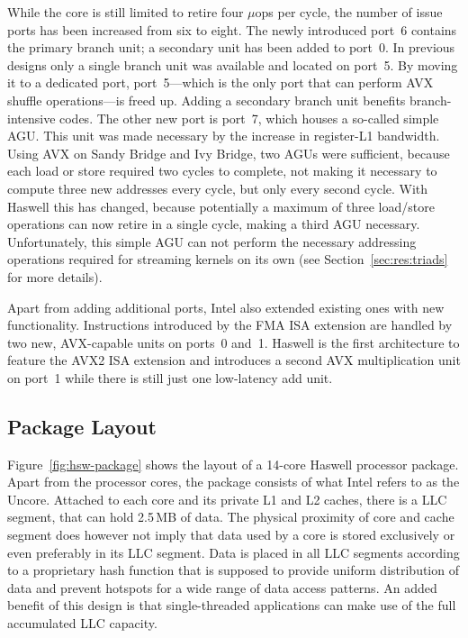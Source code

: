 \documentclass{llncs}
\begin{document}
While the core is still limited to retire four $\mu$ops per cycle, the number
of issue ports has been increased from six to eight. The newly introduced
port~6 contains the primary branch unit; a secondary unit has been added to
port~0. In previous designs only a single branch unit was available and located
on port~5.  By moving it to a dedicated port, port~5---which
is the only port that can perform AVX shuffle operations---is freed up. Adding
a secondary branch unit benefits branch-intensive codes. The other new port
is port~7, which houses a so-called simple \ac{AGU}. This unit was made
necessary by the increase in register-L1 bandwidth. Using AVX on Sandy Bridge
and Ivy Bridge, two \ac{AGU}s were sufficient, because each load or store
required two cycles to complete, not making it necessary to compute three new
addresses every cycle, but only every second cycle. With Haswell this has
changed, because potentially a maximum of three load/store operations can now
retire in a single cycle, making a third \ac{AGU} necessary. Unfortunately,
this simple \ac{AGU} can not perform the necessary addressing operations
required for streaming kernels on its own (see Section~\ref{sec:res:triads} for
more details).

Apart from adding additional ports, Intel also extended existing ones with new
functionality. Instructions introduced by the \ac{FMA} \ac{ISA} extension are
handled by two new, AVX-capable units on ports~0 and~1. Haswell is the
first architecture to feature the AVX2 ISA extension and introduces
a second \ac{AVX} multiplication unit on port~1 while there is still just one
low-latency add unit.

\subsection{Package Layout}
\label{sec:hsw:package}

Figure~\ref{fig:hsw-package} shows the layout of a 14-core Haswell processor
package. Apart from the processor cores, the package consists of what Intel
refers to as the Uncore. Attached to each core and its private L1 and L2
caches, there is a \ac{LLC} segment, that can hold 2.5\,MB of data. The
physical proximity of core and cache segment does however not imply that data
used by a core is stored exclusively or even preferably in its \ac{LLC} segment.
Data is placed in all LLC segments according to a proprietary hash function
that is supposed to provide uniform distribution of data and prevent hotspots for
a wide range of data access patterns. An added benefit of this design is that
single-threaded applications can make use of the full accumulated \ac{LLC} capacity.
\end{document}
